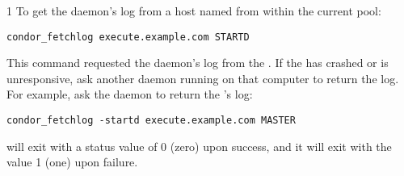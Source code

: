 \begin{ManPage}{\label{man-condor-fetchlog}}{1}
To get the  daemon's log from a host named
 from within the current pool:
\begin{verbatim}
condor_fetchlog execute.example.com STARTD
\end{verbatim}

This command requested the  daemon's log from the
.
If the  has crashed or is unresponsive,
ask another daemon
running on that computer to return the log.
For example, ask the  daemon to return the
's log:

\begin{verbatim}
condor_fetchlog -startd execute.example.com MASTER
\end{verbatim}

\ExitStatus
{} will exit with a status value of 0 (zero) upon success,
and it will exit with the value 1 (one) upon failure.

\end{ManPage}
